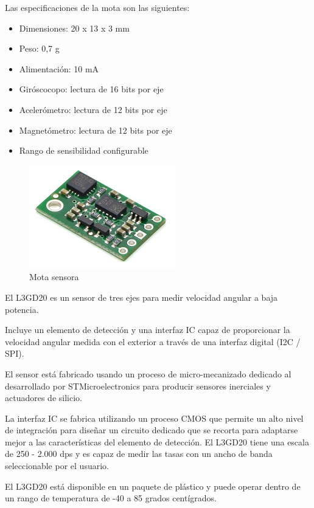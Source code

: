 				Las especificaciones de la mota son las siguientes:
				
				\begin{itemize}
					\item Dimensiones: 20 x 13 x 3 mm
					\item Peso: 0,7 g
					\item Alimentación: 10 mA 
					\item Giróscocopo: lectura de 16 bits por eje
					\item Acelerómetro: lectura de 12 bits por eje
					\item Magnetómetro: lectura de 12 bits por eje
					\item Rango de sensibilidad configurable
				\end{itemize}
				
				\begin{figure}[h]
					\centering
					\includegraphics{imagenes/pololu.jpg}
					\caption{Mota sensora}
					\label{contexto:figura}
				\end{figure}
				
				El L3GD20 es un sensor de tres ejes para medir velocidad angular a baja potencia.
				
				Incluye un elemento de detección y una interfaz IC capaz de proporcionar la velocidad angular medida con el exterior a través de una interfaz digital (I2C / SPI).
				
				El sensor está fabricado usando un proceso de micro-mecanizado dedicado al desarrollado por STMicroelectronics para producir sensores inerciales y actuadores de silicio.
				
				La interfaz IC se fabrica utilizando un proceso CMOS que permite un alto nivel de integración para dise\~nar un circuito dedicado que se recorta para adaptarse mejor a las características del elemento de detección. El L3GD20 tiene una escala de 250 - 2.000 dps y es capaz de medir las tasas con un ancho de banda seleccionable por el usuario.
				
				El L3GD20 está disponible en un paquete de plástico y puede operar dentro de un rango de temperatura de -40 a 85 grados centígrados.
				
